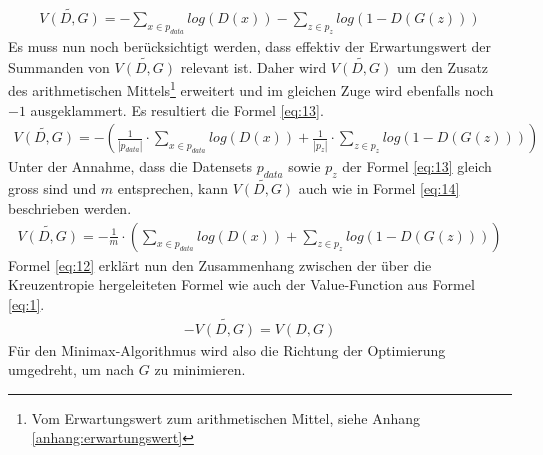 \begin{align}
    \widetilde{V(D,G)} = - \sum_{x \in p_{data}} log(D(x)) - \sum_{z \in p_{z}} log(1 - D(G(z)))
\end{align}
Es muss nun noch berücksichtigt werden, dass effektiv der Erwartungswert der Summanden von $\widetilde{V(D,G)}$ relevant ist. Daher
wird $\widetilde{V(D,G)}$ um den Zusatz des arithmetischen Mittels\footnote{Vom Erwartungswert zum arithmetischen Mittel, siehe Anhang \ref{anhang:erwartungswert}} erweitert und im gleichen Zuge wird ebenfalls noch
$-1$ ausgeklammert. Es resultiert die Formel \ref{eq:13}.
\begin{align}
    \widetilde{V(D,G)} = - (\frac{1}{|p_{data}|} \cdot \sum_{x \in p_{data}} log(D(x)) + \frac{1}{|p_{z}|} \cdot \sum_{z \in p_{z}} log(1 - D(G(z))))\label{eq:13}
\end{align}
Unter der Annahme, dass die Datensets $p_{data}$ sowie $p_{z}$ der Formel \ref{eq:13} gleich gross sind und $m$ entsprechen, kann $\widetilde{V(D,G)}$
auch wie in Formel \ref{eq:14} beschrieben werden.
\begin{align}
    \widetilde{V(D,G)} = - \frac{1}{m} \cdot (\sum_{x \in p_{data}} log(D(x)) + \sum_{z \in p_{z}} log(1 - D(G(z))))\label{eq:14}
\end{align}
Formel \ref{eq:12} erklärt nun den Zusammenhang zwischen der über die Kreuzentropie hergeleiteten Formel wie auch der Value-Function aus Formel \ref{eq:1}.
\begin{align}
    -\widetilde{V(D,G)} = V(D,G)\label{eq:12}
\end{align}
Für den Minimax-Algorithmus wird also die Richtung der Optimierung umgedreht, um nach $G$ zu minimieren.

\newpage
